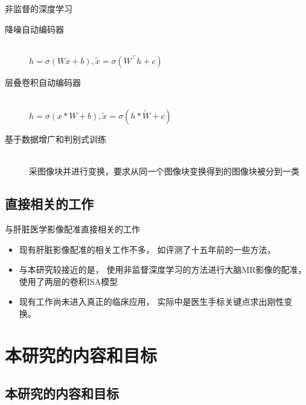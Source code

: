 \documentclass {beamer}
\newcommand{\trans}[1]{#1^\intercal}
\begin{document}
\begin{frame}{非监督的深度学习}
    \begin{description}
        \item[降噪自动编码器\cite{vincent2010stacked}]
            \hfill \\
            $h=\sigma(Wx+b), \tilde{x}=\sigma(\trans{W}h+c)$
        \item[层叠卷积自动编码器\cite{masci2011stacked}]
            \hfill \\
            $h=\sigma(x*W+b), \tilde{x}=\sigma(h*\tilde{W}+c)$
        \item[基于数据增广和判别式训练\cite{dosovitskiy2014discriminative}]
            \hfill \\
            采图像块并进行变换，要求从同一个图像块变换得到的图像块被分到一类
    \end{description}
\end{frame}

\subsection{直接相关的工作}
\begin{frame}{与肝脏医学影像配准直接相关的工作}
    \begin{itemize}
        \item 现有肝脏影像配准的相关工作不多，
            如\cite{carrillo2000semiautomatic}评测了十五年前的一些方法，
        \item 与本研究较接近的是\cite{wu2013unsupervised}，
            使用非监督深度学习的方法进行大脑MR影像的配准，
            使用了两层的卷积ISA模型
        \item 现有工作尚未进入真正的临床应用，
            实际中是医生手标关键点求出刚性变换。
    \end{itemize}
\end{frame}


\section{本研究的内容和目标}

\subsection{本研究的内容和目标}
\end{document}
